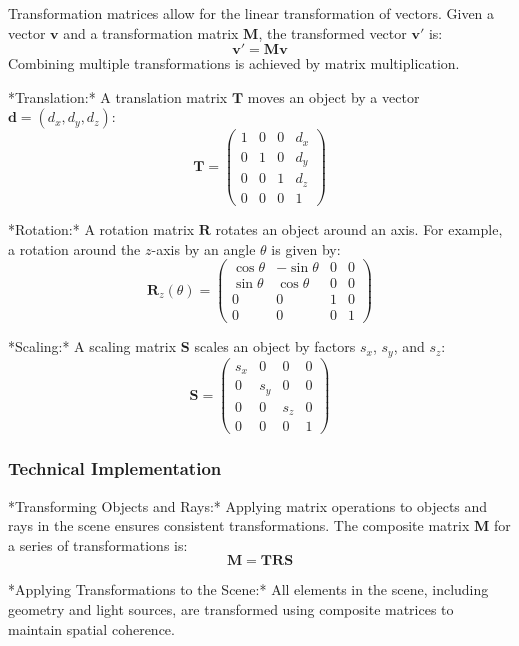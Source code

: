 \documentclass[12pt]{article}
\begin{document}
Transformation matrices allow for the linear transformation of vectors. Given a vector \(\mathbf{v}\) and a transformation matrix \(\mathbf{M}\), the transformed vector \(\mathbf{v}'\) is:
\[
    \mathbf{v}' = \mathbf{M} \mathbf{v}
\]
Combining multiple transformations is achieved by matrix multiplication.

*Translation:* A translation matrix \(\mathbf{T}\) moves an object by a vector \(\mathbf{d} = (d_x, d_y, d_z)\):
\[
    \mathbf{T} = \begin{pmatrix}
        1 & 0 & 0 & d_x \\
        0 & 1 & 0 & d_y \\
        0 & 0 & 1 & d_z \\
        0 & 0 & 0 & 1
    \end{pmatrix}
\]

*Rotation:* A rotation matrix \(\mathbf{R}\) rotates an object around an axis. For example, a rotation around the \(z\)-axis by an angle \(\theta\) is given by:
\[
    \mathbf{R}_z(\theta) = \begin{pmatrix}
        \cos \theta & -\sin \theta & 0 & 0 \\
        \sin \theta & \cos \theta  & 0 & 0 \\
        0           & 0            & 1 & 0 \\
        0           & 0            & 0 & 1
    \end{pmatrix}
\]

*Scaling:* A scaling matrix \(\mathbf{S}\) scales an object by factors \(s_x\), \(s_y\), and \(s_z\):
\[
    \mathbf{S} = \begin{pmatrix}
        s_x & 0   & 0   & 0 \\
        0   & s_y & 0   & 0 \\
        0   & 0   & s_z & 0 \\
        0   & 0   & 0   & 1
    \end{pmatrix}
\]


\subsubsection{Technical Implementation}
*Transforming Objects and Rays:* Applying matrix operations to objects and rays in the scene ensures consistent transformations. The composite matrix \(\mathbf{M}\) for a series of transformations is:
\[
    \mathbf{M} = \mathbf{T} \mathbf{R} \mathbf{S}
\]

*Applying Transformations to the Scene:* All elements in the scene, including geometry and light sources, are transformed using composite matrices to maintain spatial coherence.
\end{document}
